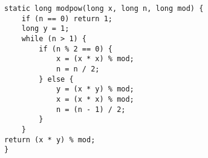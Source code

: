 \begin{verbatim}
static long modpow(long x, long n, long mod) {
	if (n == 0) return 1;
	long y = 1;
	while (n > 1) {
		if (n % 2 == 0) {
			x = (x * x) % mod;
			n = n / 2;
		} else {
			y = (x * y) % mod;
			x = (x * x) % mod;
			n = (n - 1) / 2;
		}
	}
return (x * y) % mod;
}
\end{verbatim}